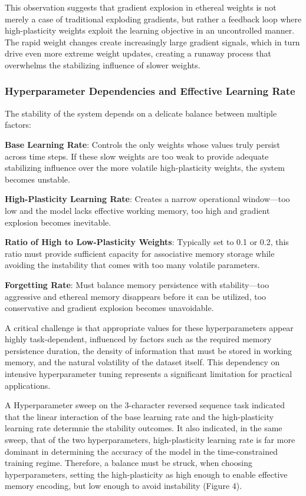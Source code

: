 \documentclass{article} %
\begin{document}
This observation suggests that gradient explosion in ethereal weights is not merely a case of traditional exploding gradients, but rather a feedback loop where high-plasticity weights exploit the learning objective in an uncontrolled manner. The rapid weight changes create increasingly large gradient signals, which in turn drive even more extreme weight updates, creating a runaway process that overwhelms the stabilizing influence of slower weights.

\subsubsection{Hyperparameter Dependencies and Effective Learning Rate}

The stability of the system depends on a delicate balance between multiple factors:

\textbf{Base Learning Rate}: Controls the only weights whose values truly persist across time steps. If these slow weights are too weak to provide adequate stabilizing influence over the more volatile high-plasticity weights, the system becomes unstable.

\textbf{High-Plasticity Learning Rate}: Creates a narrow operational window—too low and the model lacks effective working memory, too high and gradient explosion becomes inevitable.

\textbf{Ratio of High to Low-Plasticity Weights}: Typically set to 0.1 or 0.2, this ratio must provide sufficient capacity for associative memory storage while avoiding the instability that comes with too many volatile parameters.

\textbf{Forgetting Rate}: Must balance memory persistence with stability—too aggressive and ethereal memory disappears before it can be utilized, too conservative and gradient explosion becomes unavoidable.

A critical challenge is that appropriate values for these hyperparameters appear highly task-dependent, influenced by factors such as the required memory persistence duration, the density of information that must be stored in working memory, and the natural volatility of the dataset itself. This dependency on intensive hyperparameter tuning represents a significant limitation for practical applications.

A Hyperparameter sweep on the 3-character reversed sequence task indicated that the linear interaction of the base learning rate and the high-plasticity learning rate determnie the stability outcomes. It also indicated, in the same sweep, that of the two hyperparameters, high-plasticity learning rate is far more dominant in determining the accuracy of the model in the time-constrained training regime. Therefore, a balance must be struck, when choosing hyperparameters, setting the high-plasticity as high enough to enable effective memory encoding, but low enough to avoid instability (Figure 4).
\end{document}
